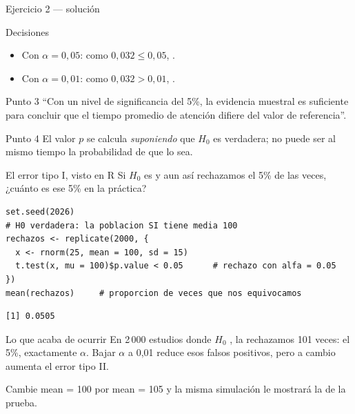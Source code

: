 \documentclass[aspectratio=169,10pt]{beamer}
\newcommand{\fx}[1]{{\ttfamily\color{uniAzul}#1}}
\begin{document}
\begin{frame}{Ejercicio 2 — solución}
  \small
  \begin{block}{Decisiones}
    \footnotesize
    \begin{itemize}
      \item Con $\alpha=0{,}05$: como $0{,}032\le 0{,}05$, .
      \item Con $\alpha=0{,}01$: como $0{,}032>0{,}01$, .
    \end{itemize}
  \end{block}

  \vspace{0.15cm}
  \begin{exampleblock}{Punto 3}
    \footnotesize
    ``Con un nivel de significancia del 5\%, la evidencia muestral es
    suficiente para concluir que el tiempo promedio de atención difiere del
    valor de referencia''.
  \end{exampleblock}

  \vspace{0.1cm}
  \begin{alertblock}{Punto 4}
    \footnotesize
     El valor $p$ se calcula \emph{suponiendo} que $H_0$ es
    verdadera; no puede ser al mismo tiempo la probabilidad de que lo sea.
  \end{alertblock}
\end{frame}

\begin{frame}[fragile]{El error tipo I, visto en R}
  \scriptsize
  Si $H_0$ es  y aun así rechazamos el 5\% de las veces,
  ¿cuánto es ese 5\% en la práctica?
\begin{lstlisting}[style=Rmini]
set.seed(2026)
# H0 verdadera: la poblacion SI tiene media 100
rechazos <- replicate(2000, {
  x <- rnorm(25, mean = 100, sd = 15)
  t.test(x, mu = 100)$p.value < 0.05      # rechazo con alfa = 0.05
})
mean(rechazos)     # proporcion de veces que nos equivocamos
\end{lstlisting}
\begin{lstlisting}[style=Rout]
[1] 0.0505
\end{lstlisting}

  \vspace{-0.05cm}
  \begin{alertblock}{Lo que acaba de ocurrir}
    \scriptsize
    En 2\,000 estudios donde $H_0$ , la rechazamos 101
    veces: el 5\%, exactamente $\alpha$.  Bajar $\alpha$ a 0,01 reduce
    esos falsos positivos, pero a cambio aumenta el error tipo II.
  \end{alertblock}

  \vspace{0.05cm}
  {\tiny\color{uniGris} Cambie \fx{mean = 100} por \fx{mean = 105} y la misma
  simulación le mostrará la  de la prueba.}
\end{frame}
\end{document}
